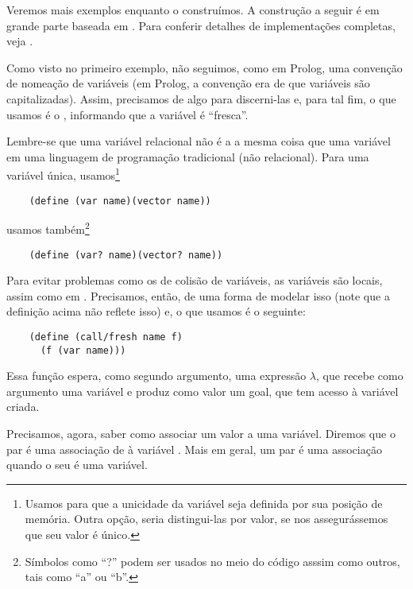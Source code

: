 \documentclass{article}
\begin{document}
  Veremos mais exemplos enquanto o construímos. A construção a seguir
  é em grande parte baseada em \cite{will}. Para conferir detalhes de
  implementações completas, veja \cite{kanren}.

  Como visto no primeiro exemplo, não seguimos, como em Prolog, uma
  convenção de nomeação de variáveis (em Prolog, a convenção era de
  que variáveis são  capitalizadas). Assim, precisamos de algo para
  discerni-las e, para tal fim, o que usamos é o ,
  informando que a variável é ``fresca''.

  
  Lembre-se que uma variável relacional não é a a mesma
  coisa que uma variável em uma linguagem de programação tradicional
  (não relacional). Para uma variável única, usamos\footnote{Usamos
     para que a unicidade da variável seja definida
    por sua posição de memória. Outra opção, seria distingui-las por
    valor, se nos assegurássemos que seu valor é único.}
  
  \begin{lstlisting}
    (define (var name)(vector name))
  \end{lstlisting}

  \noindent usamos também\footnote{Símbolos como ``?'' podem ser
    usados no meio do código asssim como outros, tais como ``a'' ou ``b''.}

  \begin{lstlisting}
    (define (var? name)(vector? name))
  \end{lstlisting}

  Para evitar problemas como os de colisão de variáveis, as variáveis
  são locais, assim como em . Precisamos, então, de
  uma forma de modelar isso (note que a definição acima não reflete
  isso) e, o que usamos é o seguinte:

  \begin{lstlisting}
    (define (call/fresh name f)
      (f (var name)))
  \end{lstlisting}

  Essa função espera, como segundo argumento, uma expressão $\lambda$, que
  recebe como argumento uma variável e produz como valor um goal, que
  tem acesso à variável criada.
  
  Precisamos, agora, saber como associar um valor a uma
  variável. Diremos que o par  é uma associação de
   à variável . Mais em geral, um par é uma
  associação quando o seu  é uma variável.
\end{document}
